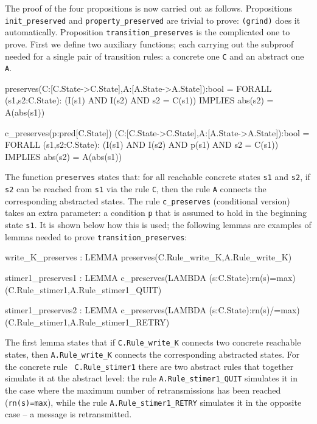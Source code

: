 The proof  of the four  propositions  is now carried  out as  follows.
Propositions {\tt init\_preserved}  and {\tt  property\_preserved} are
trivial  to prove: {\tt  (grind)} does  it automatically.  Proposition
{\tt transition\_preserves} is the  complicated one to prove. First we
define two auxiliary functions; each  carrying out the subproof needed
for a single pair of  transition rules: a concrete one  {\tt C} and an
abstract one {\tt A}.

\begin{smallsession}
  preserves(C:[C.State->C.State],A:[A.State->A.State]):bool =
    FORALL (s1,s2:C.State):
      (I(s1) AND I(s2) AND s2 = C(s1))
        IMPLIES  
      abs(s2) = A(abs(s1))

  c_preserves(p:pred[C.State])
             (C:[C.State->C.State],A:[A.State->A.State]):bool =
    FORALL (s1,s2:C.State):
      (I(s1) AND I(s2) AND p(s1) AND s2 = C(s1))
        IMPLIES
      abs(s2) = A(abs(s1))
\end{smallsession}

The function  {\tt preserves} states  that: for all reachable concrete
states {\tt s1} and {\tt s2}, if {\tt s2} can be reached from {\tt s1}
via the rule {\tt C}, then the rule {\tt A} connects the corresponding 
abstracted states. The rule {\tt c\_preserves} (conditional version) takes an
extra parameter: a condition {\tt p} that is assumed to hold in the 
beginning state {\tt s1}. It is shown below how this is used; the following
lemmas are examples of lemmas needed to prove {\tt transition\_preserves}:

\begin{smallsession}
  write_K_preserves : LEMMA
    preserves(C.Rule_write_K,A.Rule_write_K)

  stimer1_preserves1 : LEMMA
    c_preserves(LAMBDA (s:C.State):rn(s)=max)
               (C.Rule_stimer1,A.Rule_stimer1_QUIT)

  stimer1_preserves2 : LEMMA
    c_preserves(LAMBDA (s:C.State):rn(s)/=max)
               (C.Rule_stimer1,A.Rule_stimer1_RETRY)
\end{smallsession}

The  first  lemma states that if  {\tt  C.Rule\_write\_K} connects two
concrete reachable states,   then  {\tt A.Rule\_write\_K}  connects  the
corresponding  abstracted  states.     For   the concrete    rule {\tt
C.Rule\_stimer1} there are two abstract rules that together simulate it
at the abstract level: the rule {\tt A.Rule\_stimer1\_QUIT} simulates it
in the  case where  the   maximum number of  retransmissions has  been
reached ({\tt rn(s)=max}),  while the rule  {\tt A.Rule\_stimer1\_RETRY}
simulates it in the opposite case -- a message is retransmitted.

